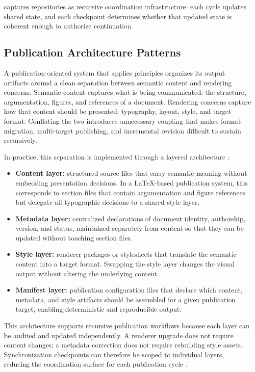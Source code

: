  captures repositories as recursive coordination infrastructure: each cycle updates shared state, and each checkpoint determines whether that updated state is coherent enough to authorize continuation.

\subsection{Publication Architecture Patterns}

A publication-oriented system that applies  principles organizes its output artifacts around a clean separation between semantic content and rendering concerns. Semantic content captures what is being communicated: the structure, argumentation, figures, and references of a document. Rendering concerns capture how that content should be presented: typography, layout, style, and target format. Conflating the two introduces unnecessary coupling that makes format migration, multi-target publishing, and incremental revision difficult to sustain recursively.

In practice, this separation is implemented through a layered architecture \cite{Parnas1972Modularization}:
\begin{itemize}
  \item \textbf{Content layer:} structured source files that carry semantic meaning without embedding presentation decisions. In a \LaTeX-based publication system, this corresponds to section files that contain argumentation and figure references but delegate all typographic decisions to a shared style layer.
  \item \textbf{Metadata layer:} centralized declarations of document identity, authorship, version, and status, maintained separately from content so that they can be updated without touching section files.
  \item \textbf{Style layer:} renderer packages or stylesheets that translate the semantic content into a target format. Swapping the style layer changes the visual output without altering the underlying content.
  \item \textbf{Manifest layer:} publication configuration files that declare which content, metadata, and style artifacts should be assembled for a given publication target, enabling deterministic and reproducible output.
\end{itemize}

This architecture supports recursive publication workflows because each layer can be audited and updated independently. A renderer upgrade does not require content changes; a metadata correction does not require rebuilding style assets. Synchronization checkpoints can therefore be scoped to individual layers, reducing the coordination surface for each publication cycle \cite{Vogels2009EventuallyConsistent}.


